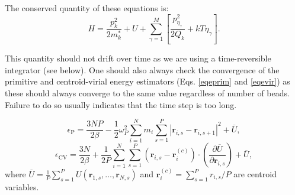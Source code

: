 \documentclass[12pt,a4paper]{article}
\begin{document}
The conserved quantity of these equations is:
\begin{equation}
H= \frac{p_k^2}{2m_k^*} + U + \sum_{\gamma=1}^M\left[\frac{p^2_{\eta_\gamma}}{2Q_k}+kT\eta_\gamma\right]   .
\end{equation}

This quantity should not drift over time as we are using a time-reversible integrator (see below). One should also always check the convergence of the primitive and centroid-virial energy estimators (Eqs. \ref{eqeprim} and \ref{eqevir}) as these should always converge to the same value regardless of number of beads. Failure to do so usually indicates that the time step is too long.

\begin{equation}
\epsilon_\mathrm{P}=\frac{3NP}{2\beta}-\frac{1}{2}\omega_P^2\sum_{i=1}^N m_i\sum_{s=1}^P |\mathbf{r}_{i,s}-\mathbf{r}_{i,s+1}|^2+\overline{U} ,
\label{eqeprim}
\end{equation}
\begin{equation}
\epsilon_{\mathrm{CV}}=\frac{3N}{2\beta}+\frac{1}{2P}\sum_{i=1}^N\sum_{s=1}^P(\mathbf{r}_{i,s}-\mathbf{r}_i^{(c)})\cdot\left(\frac{\partial \overline{U}}{\partial\mathbf{r}_{i,s}} \right)+\overline{U}  ,
\label{eqevir}
\end{equation}
where $\overline{U}=\frac{1}{P}\sum_{s=1}^P U(\mathbf{r}_{1,s},\dots,\mathbf{r}_{N,s})$ and $\mathbf{r}_i^{(c)}=\sum_{s=1}^Pr_{i,s}/P $ are centroid variables.
\end{document}
